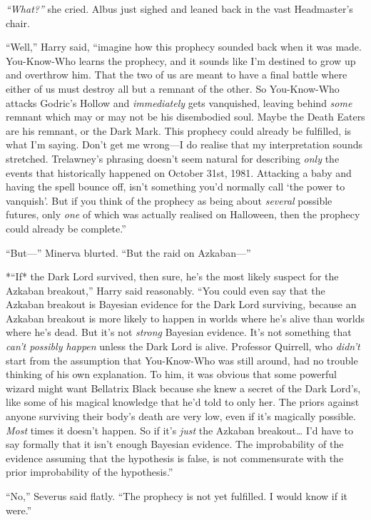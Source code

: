 \emph{``What?''} she cried. Albus just sighed and leaned back in the
vast Headmaster's chair.

``Well,'' Harry said, ``imagine how this prophecy sounded back when it
was made. You-Know-Who learns the prophecy, and it sounds like I'm
destined to grow up and overthrow him. That the two of us are meant to
have a final battle where either of us must destroy all but a remnant of
the other. So You-Know-Who attacks Godric's Hollow and
\emph{immediately} gets vanquished, leaving behind \emph{some} remnant
which may or may not be his disembodied soul. Maybe the Death Eaters are
his remnant, or the Dark Mark. This prophecy could already be fulfilled,
is what I'm saying. Don't get me wrong---I do realise that my
interpretation sounds stretched. Trelawney's phrasing doesn't seem
natural for describing \emph{only} the events that historically happened
on October 31st, 1981. Attacking a baby and having the spell bounce off,
isn't something you'd normally call `the power to vanquish'. But if you
think of the prophecy as being about \emph{several} possible futures,
only \emph{one} of which was actually realised on Halloween, then the
prophecy could already be complete.''

``But---'' Minerva blurted. ``But the raid on Azkaban---''

*``If* the Dark Lord survived, then sure, he's the most likely suspect
for the Azkaban breakout,'' Harry said reasonably. ``You could even say
that the Azkaban breakout is Bayesian evidence for the Dark Lord
surviving, because an Azkaban breakout is more likely to happen in
worlds where he's alive than worlds where he's dead. But it's not
\emph{strong} Bayesian evidence. It's not something that \emph{can't
possibly happen} unless the Dark Lord is alive. Professor Quirrell, who
\emph{didn't} start from the assumption that You-Know-Who was still
around, had no trouble thinking of his own explanation. To him, it was
obvious that some powerful wizard might want Bellatrix Black because she
knew a secret of the Dark Lord's, like some of his magical knowledge
that he'd told to only her. The priors against anyone surviving their
body's death are very low, even if it's magically possible. \emph{Most}
times it doesn't happen. So if it's \emph{just} the Azkaban
breakout\ldots{} I'd have to say formally that it isn't enough Bayesian
evidence. The improbability of the evidence assuming that the hypothesis
is false, is not commensurate with the prior improbability of the
hypothesis.''

``No,'' Severus said flatly. ``The prophecy is not yet fulfilled. I
would know if it were.''

